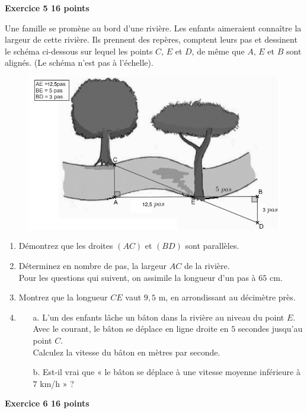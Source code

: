 \documentclass[11pt]{article}
\begin{document}
 
\newpage
 \textbf{\large{}Exercice 5   \hfill 16 points}
 
 
 Une famille se promène au bord d'une rivière. Les enfants aimeraient connaître la largeur de cette rivière. Ils prennent des repères, comptent leurs pas et dessinent le schéma ci-dessous sur lequel les points $C$, $E$ et $D$, de même que $A$, $E$ et $B$ sont alignés. (Le schéma n'est pas à l'échelle). 
 \begin{figure}[H]
 \includegraphics[scale=0.8]{riviere.png}
 \end{figure}
 
 \begin{enumerate}
 \item Démontrez que les droites $(AC)$ et $(BD)$ sont parallèles. 
 \item Déterminez en nombre de pas, la largeur $AC$ de la rivière. \\
 Pour les questions qui suivent, on assimile la longueur d'un pas à $65$ cm. 
 \item Montrez que la longueur $CE$ vaut $9,5$ m, en arrondissant au décimètre près. 
 \item \begin{itemize}
 \item[a.] L'un des enfants lâche un bâton dans la rivière au niveau du point $E$. Avec le courant, le bâton se déplace en ligne droite en $5$ secondes jusqu'au point $C$. \\ Calculez la vitesse du bâton en mètres par seconde. 
 \item[b.] Est-il vrai que « le bâton se déplace à une vitesse moyenne inférieure à $7$ km/h » ?
 \end{itemize}
 \end{enumerate}
 
 
\newpage
 \textbf{\large{}Exercice 6   \hfill 16 points}
\end{document}
